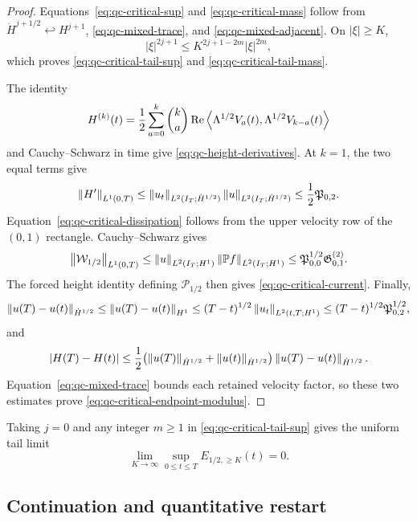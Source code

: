 \begin{proof}
Equations~\eqref{eq:qc-critical-sup} and
\eqref{eq:qc-critical-mass} follow from
\(\dot H^{j+1/2}\hookleftarrow H^{j+1}\),
\eqref{eq:qc-mixed-trace}, and \eqref{eq:qc-mixed-adjacent}.
On \(|\xi|\ge K\),
\[
 |\xi|^{2j+1}\le K^{2j+1-2m}|\xi|^{2m},
\]
which proves \eqref{eq:qc-critical-tail-sup} and
\eqref{eq:qc-critical-tail-mass}.

The identity
\[
 H^{(k)}(t)
 =\frac12\sum_{a=0}^{k}\binom ka
 \operatorname{Re}\left\langle \Lambda^{1/2}V_a(t),\Lambda^{1/2}V_{k-a}(t)\right\rangle
\]
and Cauchy--Schwarz in time give
\eqref{eq:qc-height-derivatives}.  At \(k=1\), the two equal terms give
\[
 \left\lVert H'\right\rVert_{L^1(0,T)}
 \le\left\lVert u_t\right\rVert_{L^2(I_T;\dot H^{1/2})}
     \left\lVert u\right\rVert_{L^2(I_T;\dot H^{1/2})}
 \le\frac12\mathfrak P_{0,2}.
\]
Equation~\eqref{eq:qc-critical-dissipation} follows from the upper velocity
row of the \((0,1)\) rectangle.  Cauchy--Schwarz gives
\[
 \left\lVert \mathcal W_{1/2}\right\rVert_{L^1(0,T)}
 \le\left\lVert u\right\rVert_{L^2(I_T;H^1)}
     \left\lVert \mathbb P f\right\rVert_{L^2(I_T;H^1)}
 \le\mathfrak P_{0,0}^{1/2}\mathfrak G^{(2)}_{0,1}.
\]
The forced height identity defining \(\mathcal P_{1/2}\) then gives
\eqref{eq:qc-critical-current}.  Finally,
\[
 \left\lVert u(T)-u(t)\right\rVert_{\dot H^{1/2}}
 \le\left\lVert u(T)-u(t)\right\rVert_{H^1}
 \le(T-t)^{1/2}\left\lVert u_t\right\rVert_{L^2(t,T;H^1)}
 \le(T-t)^{1/2}\mathfrak P_{0,2}^{1/2},
\]
and
\[
 |H(T)-H(t)|
 \le\frac12\bigl(
 \left\lVert u(T)\right\rVert_{\dot H^{1/2}}+\left\lVert u(t)\right\rVert_{\dot H^{1/2}}
 \bigr)\left\lVert u(T)-u(t)\right\rVert_{\dot H^{1/2}}.
\]
Equation~\eqref{eq:qc-mixed-trace} bounds each retained velocity factor, so
these two estimates prove \eqref{eq:qc-critical-endpoint-modulus}.
\end{proof}

Taking \(j=0\) and any integer \(m\ge1\) in
\eqref{eq:qc-critical-tail-sup} gives the uniform tail limit
\begin{equation}
 \lim_{K\to\infty}\sup_{0\le t\le T}
 E_{1/2,\ge K}(t)=0.
 \label{eq:qc-critical-tail-extinction}
\end{equation}

\subsection{Continuation and quantitative restart}

